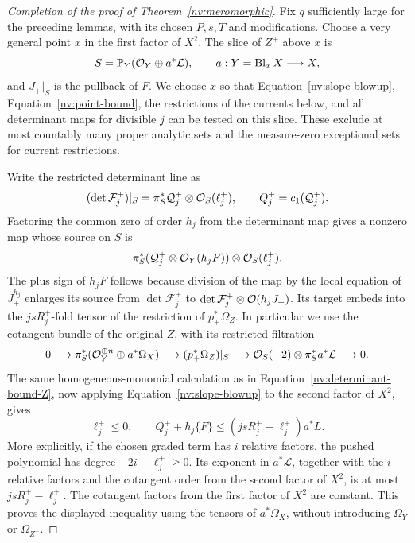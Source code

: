 \begin{proof}[Completion of the proof of Theorem~\ref{nv:meromorphic}]
Fix \(q\) sufficiently large for the preceding lemmas, with its chosen
\(P,s,T\) and modifications.  Choose a very general point \(x\) in the first
factor of \(X^2\).  The slice of \(Z^+\) above \(x\) is
\[
 S=\mathbb P_Y(\mathcal O_Y\oplus a^*\mathcal{L}),\qquad
 a:Y=\operatorname{Bl}_xX\longrightarrow X,
\]
and \(J_+|_S\) is the pullback of \(F\).  We choose \(x\) so that
Equation~\eqref{nv:slope-blowup}, Equation~\eqref{nv:point-bound}, the restrictions of
the currents below, and all determinant maps for divisible \(j\)
can be tested on this slice.  These exclude at most countably many
proper analytic sets and the measure-zero exceptional sets for
current restrictions.

Write the restricted determinant line as
\[
 (\det\mathcal F_j^+)|_S
   =\pi_S^*\mathcal{Q}_j^+\otimes\mathcal O_S(\ell_j^+),\qquad
 Q_j^+=c_1(\mathcal{Q}_j^+).
\]
Factoring the common zero of order \(h_j\) from the determinant
map gives a nonzero map whose source on \(S\) is
\[
 \pi_S^*(\mathcal{Q}_j^+\otimes\mathcal O_Y(h_jF))
                 \otimes\mathcal O_S(\ell_j^+).
\]
The plus sign of \(h_jF\) follows because division of the map by
the local equation of \(J_+^{h_j}\) enlarges its source from
\(\det\mathcal F_j^+\) to
\(\det\mathcal F_j^+\otimes\mathcal O(h_jJ_+)\).
Its target embeds into the \(jsR_j^+\)-fold tensor of the
restriction of \(p_+^*\Omega_Z\).  In particular we use the
cotangent bundle of the original \(Z\), with its restricted
filtration
\[
 0\longrightarrow
 \pi_S^*(\mathcal O_Y^{\oplus n}\oplus a^*\Omega_X)
 \longrightarrow (p_+^*\Omega_Z)|_S
 \longrightarrow
 \mathcal O_S(-2)\otimes\pi_S^*a^*\mathcal{L}
 \longrightarrow0.
\]
The same homogeneous-monomial calculation as in
Equation~\eqref{nv:determinant-bound-Z}, now applying
Equation~\eqref{nv:slope-blowup} to the second factor of \(X^2\), gives
\begin{equation}\label{nv:determinant-bound-slice}
 \ell_j^+\le0,\qquad
 Q_j^++h_j\{F\}
       \le(jsR_j^+-\ell_j^+)a^*L.
\end{equation}
More explicitly, if the chosen graded term has \(i\) relative
factors, the pushed polynomial has degree
\(-2i-\ell_j^+\ge0\).  Its exponent in \(a^*\mathscr L\), together
with the \(i\) relative factors and the cotangent order from the second
factor of \(X^2\), is at most \(jsR_j^+-\ell_j^+\).  The cotangent
factors from the first factor of \(X^2\) are constant.  This proves the
displayed inequality using
the tensors of \(a^*\Omega_X\), without introducing \(\Omega_Y\)
or \(\Omega_{Z^+}\).


\end{proof}
